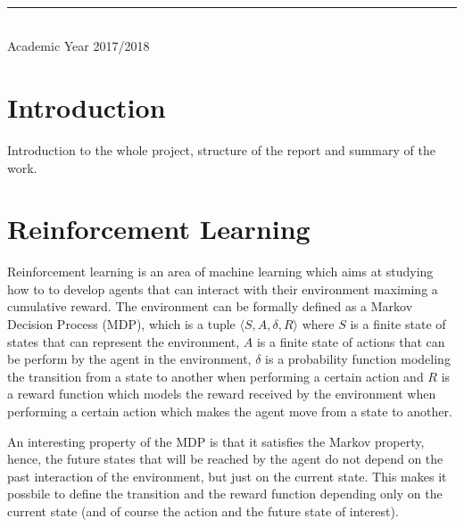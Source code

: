 \documentclass[a4paper]{article}
\begin{document}
\begin{titlepage}
\begin{minipage}{0.4\textwidth}
	\end{minipage}\\[2 cm]

    \vspace{0.2cm}
    \rule{\linewidth}{0.2 mm} \\[0.3 cm]
    \vspace*{-0.3cm}
    Academic Year 2017/2018
\end{titlepage}

\tableofcontents
\newpage




\section{Introduction}
Introduction to the whole project, structure of the report and summary of
the work.

\clearpage
\section{Reinforcement Learning}
Reinforcement learning \cite{Suttonrl18} is an area of machine learning
which aims at studying how to to develop agents that can interact with
their environment maximing a cumulative reward. The environment can be
formally defined as a Markov Decision Process (MDP), which is a tuple
$\langle S, A, \delta, R \rangle$ where $S$ is a finite state of states that can represent
the environment, $A$ is a finite state of actions that can be perform by
the agent in the environment, $\delta$ is a probability function modeling
the transition from a state to another when performing a certain action and
$R$ is a reward function which models the reward received by the environment
when performing a certain action which makes the agent move from a state
to another.

An interesting property of the MDP is that it satisfies the Markov property,
hence, the future states that will be reached by the agent do not depend
on the past interaction of the environment, but just on the current state.
This makes it possbile to define the transition and the reward function
depending only on the current state (and of course the action and the future
state of interest).
\end{document}
